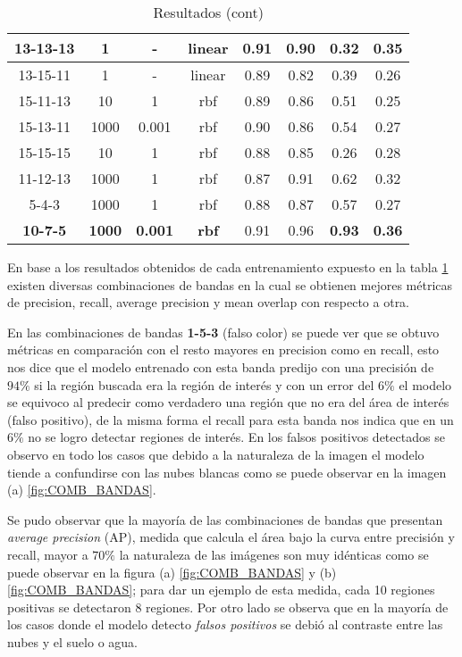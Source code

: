 \begin{table}[H]
\begin{center}
\begin{tabular}{|c|c|c|c|c|c|c|c|}
\multicolumn{1}{|c|}{13-13-13} & 1 & - & linear & 0.91 & 0.90 & 0.32 & 0.35 \\ \hline
\multicolumn{1}{|c|}{13-15-11} & 1 & - & linear & 0.89 & 0.82 & 0.39 & 0.26 \\ \hline
\multicolumn{1}{|c|}{15-11-13} & 10 & 1 & rbf & 0.89 & 0.86 & 0.51 & 0.25 \\ \hline
\multicolumn{1}{|c|}{15-13-11} & 1000 & 0.001 & rbf & 0.90 & 0.86 & 0.54 & 0.27 \\ \hline
\multicolumn{1}{|c|}{15-15-15} & 10 & 1 & rbf & 0.88 & 0.85 & 0.26 & 0.28 \\ \hline
\multicolumn{1}{|c|}{11-12-13} & 1000 & 1 & rbf & 0.87 & 0.91 & 0.62 & 0.32 \\ \hline
\multicolumn{1}{|c|}{5-4-3} & 1000 & 1 & rbf & 0.88 & 0.87 & 0.57 & 0.27 \\ \hline
\multicolumn{1}{|c|}{\textbf{10-7-5}} & \textbf{1000} &\textbf{ 0.001} & \textbf{rbf} & 0.91 & 0.96 &\cellcolor{blue!25}\textbf{0.93} & \cellcolor{blue!25}\textbf{0.36}\\ \hline
\end{tabular}
\end{center}\caption{Resultados (cont)}\label{tab:entrenam-result}
\end{table}

En base a los resultados obtenidos de cada entrenamiento expuesto en la tabla \ref{tab:entrenam-result} existen diversas combinaciones de bandas en la cual se obtienen mejores métricas de precision, recall, average precision y mean overlap con respecto a otra.  

En las combinaciones de bandas \textbf{1-5-3} (falso color) se puede ver que se obtuvo métricas en comparación con el resto mayores en precision como en recall, esto nos dice que el modelo entrenado con esta banda predijo con una precisión de  $94\%$  si la región buscada era la región de interés y con un error del $6\%$ el modelo se equivoco al predecir como verdadero una región que no era del área de interés (falso positivo), de la misma forma el recall para esta banda nos indica que en un $6\%$ no se logro detectar regiones de interés. En los falsos positivos detectados se observo en todo los casos que debido a la naturaleza de la imagen el modelo tiende a confundirse con las nubes blancas como se puede observar en la imagen (a) \ref{fig:COMB_BANDAS}.

Se pudo observar que la mayoría de las combinaciones de bandas que presentan \textit{average precision} (AP), medida que calcula  el área bajo la curva entre precisión y recall, mayor a $70\%$ la naturaleza de las imágenes son muy idénticas como se puede observar en la figura (a) \ref{fig:COMB_BANDAS} y (b) \ref{fig:COMB_BANDAS}; para dar un ejemplo de esta medida, cada 10 regiones positivas se detectaron $8$ regiones. Por otro lado se observa que en la mayoría de los casos donde el modelo detecto \textit{falsos positivos} se debió al contraste entre las nubes y el suelo o agua.



